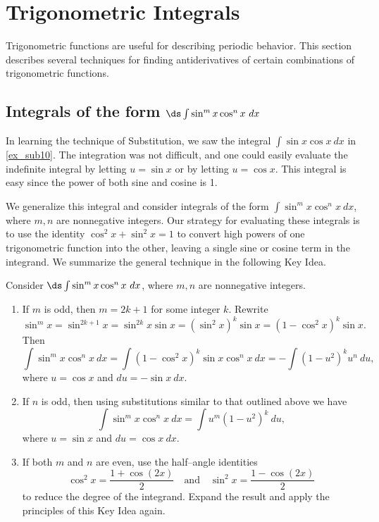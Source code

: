 

\section{Trigonometric Integrals}\label{sec:trigint}

Trigonometric functions are useful for describing periodic behavior. This section describes several techniques for finding antiderivatives of certain combinations of trigonometric functions.

\subsection*{Integrals of the form $\ds \int \sin^m x\cos^n x\ dx$}

In learning the technique of Substitution, we saw the integral $\int \sin x\cos x\ dx$ in \autoref{ex_sub10}. The integration was not difficult, and one could easily evaluate the indefinite integral by letting $u=\sin x$ or by letting $u = \cos x$. This integral is easy since the power of both sine and cosine is 1.

We generalize this integral and consider integrals of the form $\int \sin^mx\cos^nx\ dx$, where $m,n$ are nonnegative integers. Our strategy for evaluating these integrals is to use the identity $\cos^2x+\sin^2x=1$ to convert high powers of one trigonometric function into the other, leaving a single sine or cosine term in the integrand. We summarize the general technique in the following Key Idea.


\setboxwidth{60pt}
{Consider $\ds \int \sin^mx\cos^nx\ dx$, where $m,n$ are nonnegative integers.
	\begin{enumerate}
	\item		If $m$ is odd, then $m=2k+1$ for some integer $k$. Rewrite \small
			$$ \sin^mx = \sin^{2k+1}x = \sin^{2k}x\sin x = (\sin^2x)^k\sin x = (1-\cos^2x)^k\sin x.$$\normalsize
			Then \small
			$$\int \sin^mx\cos^nx\ dx = \int (1-\cos^2x)^k\sin x\cos^nx\ dx = -\int (1-u^2)^ku^n\ du,$$\normalsize
			where $u = \cos x$ and $du = -\sin x\ dx$. 
	\item		If $n$ is odd, then using substitutions similar to that outlined above we have
			\small
			$$ \int \sin^mx\cos^nx\ dx = \int u^m(1-u^2)^k\ du,$$ \normalsize
			where $u = \sin x$ and $du = \cos x\ dx$.
	\item		If both $m$ and $n$ are even, use the half--angle identities
		\small$$  \cos^2x = \frac{1+\cos (2x)}{2} \quad \text{and}\quad \sin^2x = \frac{1-\cos(2x)}2$$\normalsize
	to reduce the degree of the integrand. Expand the result and apply the principles of this Key Idea again.
	\end{enumerate}}

